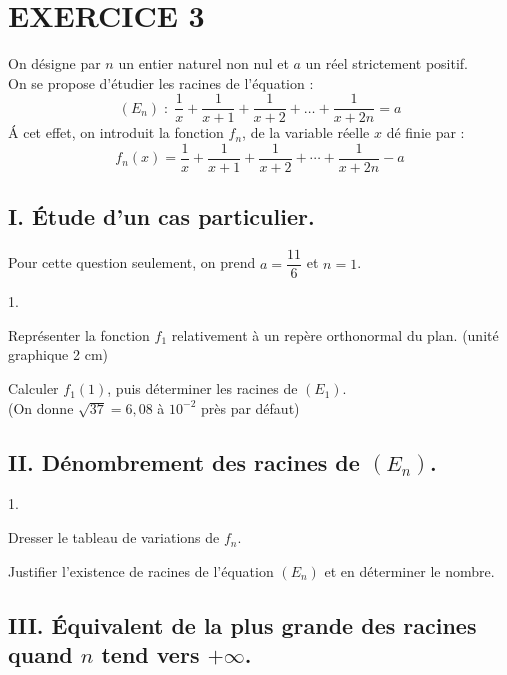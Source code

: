 \documentclass[11pt]{article}%
\begin{document}
\section*{EXERCICE 3}

On désigne par $n$ un entier naturel non nul et $a$ un réel strictement
positif.\\
On se propose d'étudier les racines de l'équation : 
\[
(E_{n})\; :\;\dfrac{1}{x} + \dfrac{1}{x + 1} + \dfrac{1}{x + 2} +
\ldots + \dfrac{1}{x + 2n} = a
\]
\'A cet effet, on introduit la fonction $f_{n}$, de la variable réelle
$x$ dé
finie par : 
\[
f_{n}(x) = \dfrac{1}{x} + \dfrac{1}{x + 1} + \dfrac{1}{x + 2} + \cdots
+ \dfrac{1}{x + 2n}-a
\]

\subsection*{I. Étude d'un cas particulier.}

Pour cette question seulement, on prend $a = \dfrac{11}{6}$ et $n = 1$.

\begin{noliste}{1.}
 \setlength{\itemsep}{4mm}
\item Représenter la fonction $f_{1}$ relativement à un repère
orthonormal
du plan. (unité graphique 2 cm)

\item Calculer $f_{1}(1)$, puis déterminer les racines de $(E_{1})$.\\
(On donne $\sqrt{37} = 6{,}08$ à $10^{-2}$ près par défaut)
\end{noliste}

\subsection*{II. Dénombrement des racines de $(E_{n})$.}

\begin{noliste}{1.}
 \setlength{\itemsep}{4mm}
\item Dresser le tableau de variations de $f_{n}$.

\item Justifier l'existence de racines de l'équation $(E_{n})$ et en
déterminer le nombre.
\end{noliste}

\subsection*{III. Équivalent de la plus grande des racines quand $n$
tend
vers $ + \infty $.}
\end{document}
